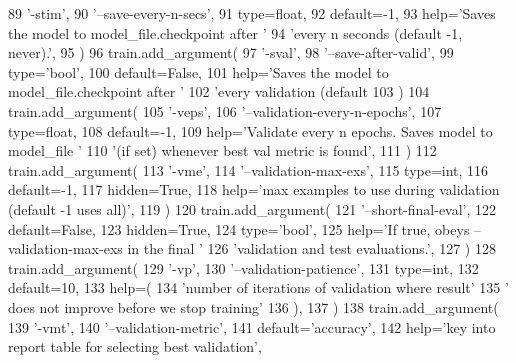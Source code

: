\begin{DoxyCode}
89         \textcolor{stringliteral}{'-stim'},
90         \textcolor{stringliteral}{'--save-every-n-secs'},
91         type=float,
92         default=-1,
93         help=\textcolor{stringliteral}{'Saves the model to model\_file.checkpoint after '}
94         \textcolor{stringliteral}{'every n seconds (default -1, never).'},
95     )
96     train.add\_argument(
97         \textcolor{stringliteral}{'-sval'},
98         \textcolor{stringliteral}{'--save-after-valid'},
99         type=\textcolor{stringliteral}{'bool'},
100         default=\textcolor{keyword}{False},
101         help=\textcolor{stringliteral}{'Saves the model to model\_file.checkpoint after '}
102         \textcolor{stringliteral}{'every validation (default %
103     )
104     train.add\_argument(
105         \textcolor{stringliteral}{'-veps'},
106         \textcolor{stringliteral}{'--validation-every-n-epochs'},
107         type=float,
108         default=-1,
109         help=\textcolor{stringliteral}{'Validate every n epochs. Saves model to model\_file '}
110         \textcolor{stringliteral}{'(if set) whenever best val metric is found'},
111     )
112     train.add\_argument(
113         \textcolor{stringliteral}{'-vme'},
114         \textcolor{stringliteral}{'--validation-max-exs'},
115         type=int,
116         default=-1,
117         hidden=\textcolor{keyword}{True},
118         help=\textcolor{stringliteral}{'max examples to use during validation (default -1 uses all)'},
119     )
120     train.add\_argument(
121         \textcolor{stringliteral}{'--short-final-eval'},
122         default=\textcolor{keyword}{False},
123         hidden=\textcolor{keyword}{True},
124         type=\textcolor{stringliteral}{'bool'},
125         help=\textcolor{stringliteral}{'If true, obeys --validation-max-exs in the final '}
126         \textcolor{stringliteral}{'validation and test evaluations.'},
127     )
128     train.add\_argument(
129         \textcolor{stringliteral}{'-vp'},
130         \textcolor{stringliteral}{'--validation-patience'},
131         type=int,
132         default=10,
133         help=(
134             \textcolor{stringliteral}{'number of iterations of validation where result'}
135             \textcolor{stringliteral}{' does not improve before we stop training'}
136         ),
137     )
138     train.add\_argument(
139         \textcolor{stringliteral}{'-vmt'},
140         \textcolor{stringliteral}{'--validation-metric'},
141         default=\textcolor{stringliteral}{'accuracy'},
142         help=\textcolor{stringliteral}{'key into report table for selecting best validation'},
}
\end{DoxyCode}
